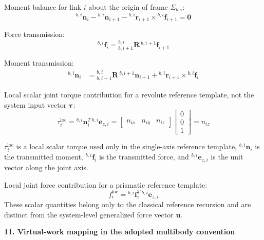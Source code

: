 \documentclass[12pt,a4paper]{report}
\newcommand{\newsymbols}[1]{\par\noindent{}#1\par\vspace{0.35em}}
\newcommand{\vect}[1]{\mathbf{#1}}
\newcommand{\mat}[1]{\mathbf{#1}}
\newcommand{\Frame}[1]{\Sigma_{#1}}
\begin{document}
Moment balance for link $i$ about the origin of frame $\Frame{b,i}$:
\begin{equation}
{}^{b,i}\vect{n}_{i} - {}^{b,i}\vect{n}_{i+1} - {}^{b,i}\vect{r}_{i+1} \times {}^{b,i}\vect{f}_{i+1} = \vect{0}
\end{equation}

Force transmission:
\begin{equation}
{}^{b,i}\vect{f}_{i}
=
{}_{b,i+1}^{b,i}\mat{R}\,{}^{b,i+1}\vect{f}_{i+1}
\end{equation}

Moment transmission:
\begin{align}
{}^{b,i}\vect{n}_{i}
&=
{}_{b,i+1}^{b,i}\mat{R}\,{}^{b,i+1}\vect{n}_{i+1}
+
{}^{b,i}\vect{r}_{i+1} \times {}^{b,i}\vect{f}_{i}
\end{align}

Local scalar joint torque contribution for a revolute reference template, not the system input vector $\boldsymbol{\tau}$:
\begin{equation}
\tau_i^{\mathrm{loc}}
=
{}^{b,i}\vect{n}_{i}^{T}\,{}^{b,i}\vect{e}_{z,i}
=
\begin{bmatrix} n_{ix} & n_{iy} & n_{iz} \end{bmatrix}
\begin{bmatrix} 0 \\ 0 \\ 1 \end{bmatrix}
=
n_{iz}
\end{equation}
\newsymbols{$\tau_i^{\mathrm{loc}}$ is a local scalar torque used only in the single-axis reference template, ${}^{b,i}\vect{n}_i$ is the transmitted moment, ${}^{b,i}\vect{f}_i$ is the transmitted force, and ${}^{b,i}\vect{e}_{z,i}$ is the unit vector along the joint axis.}

Local joint force contribution for a prismatic reference template:
\begin{equation}
f_i^{\mathrm{loc}}
=
{}^{b,i}\vect{f}_{i}^{T}\,{}^{b,i}\vect{e}_{z,i}
\end{equation}
These scalar quantities belong only to the classical reference recursion and are distinct from the system-level generalized force vector $\mathbf{u}$.

\textbf{11. Virtual-work mapping in the adopted multibody convention}
\end{document}
